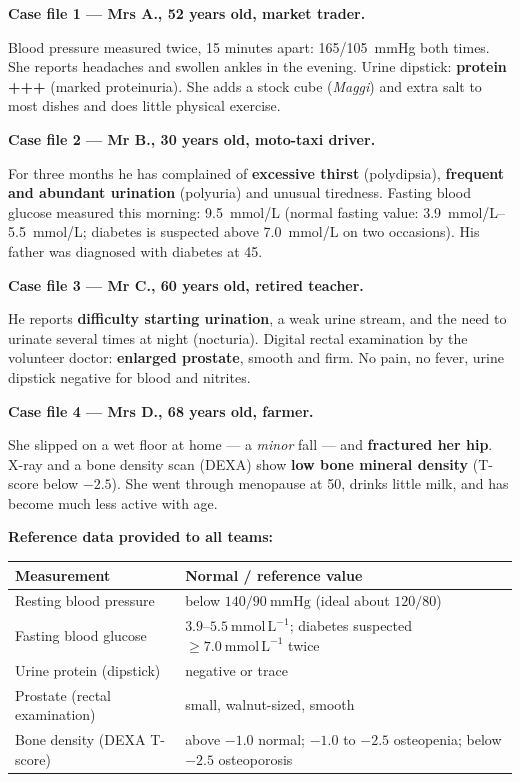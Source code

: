 \documentclass[11pt]{article}
\begin{document}
\textbf{Case file 1 — Mrs A., 52 years old, market trader.}\par
Blood pressure measured twice, 15 minutes apart: \SI{165/105}{mmHg} both times. She reports headaches and swollen ankles in the evening. Urine dipstick: \textbf{protein +++} (marked proteinuria). She adds a stock cube (\emph{Maggi}) and extra salt to most dishes and does little physical exercise.

\textbf{Case file 2 — Mr B., 30 years old, moto-taxi driver.}\par
For three months he has complained of \textbf{excessive thirst} (polydipsia), \textbf{frequent and abundant urination} (polyuria) and unusual tiredness. Fasting blood glucose measured this morning: \SI{9.5}{mmol/L} (normal fasting value: \SIrange{3.9}{5.5}{mmol/L}; diabetes is suspected above \SI{7.0}{mmol/L} on two occasions). His father was diagnosed with diabetes at 45.

\textbf{Case file 3 — Mr C., 60 years old, retired teacher.}\par
He reports \textbf{difficulty starting urination}, a weak urine stream, and the need to urinate several times at night (nocturia). Digital rectal examination by the volunteer doctor: \textbf{enlarged prostate}, smooth and firm. No pain, no fever, urine dipstick negative for blood and nitrites.

\textbf{Case file 4 — Mrs D., 68 years old, farmer.}\par
She slipped on a wet floor at home — a \emph{minor} fall — and \textbf{fractured her hip}. X-ray and a bone density scan (DEXA) show \textbf{low bone mineral density} (T-score below $-2.5$). She went through menopause at 50, drinks little milk, and has become much less active with age.

\textbf{Reference data provided to all teams:}

\begin{center}
\begin{tabularx}{\linewidth}{|l|X|}
\hline
\rowcolor{popblueL} \textbf{Measurement} & \textbf{Normal / reference value} \\
\hline
Resting blood pressure & below $140/90\ \mathrm{mmHg}$ (ideal about $120/80$) \\
\hline
Fasting blood glucose & $3.9$--$5.5\ \mathrm{mmol\,L^{-1}}$; diabetes suspected $\geq 7.0\ \mathrm{mmol\,L^{-1}}$ twice \\
\hline
Urine protein (dipstick) & negative or trace \\
\hline
Prostate (rectal examination) & small, walnut-sized, smooth \\
\hline
Bone density (DEXA T-score) & above $-1.0$ normal; $-1.0$ to $-2.5$ osteopenia; below $-2.5$ osteoporosis \\
\hline
\end{tabularx}
\end{center}
\end{document}

